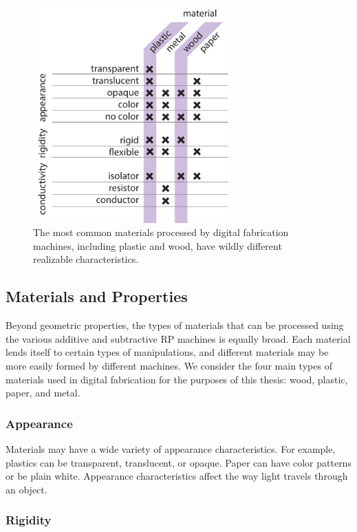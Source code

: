 \begin{figure}
\centering
\includegraphics[width=3in]{figures/fab-properties.pdf}
\caption{The most common materials processed by digital fabrication machines, including plastic and wood, have wildly different realizable characteristics.}
\label{table:fab-properties}
\end{figure}

\subsection{Materials and Properties}

Beyond geometric properties, the types of materials that can be processed using the various additive and subtractive RP machines is equally broad. Each material lends itself to certain types of manipulations, and different materials may be more easily formed by different machines. We consider the four main types of materials used in digital fabrication for the purposes of this thesis: wood, plastic, paper, and metal.

\subsubsection{Appearance}

Materials may have a wide variety of appearance characteristics. For example, plastics can be transparent, translucent, or opaque. Paper can have color patterns or be plain white. Appearance characteristics affect the way light travels through an object.

\subsubsection{Rigidity}

